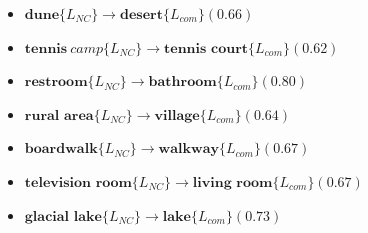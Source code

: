 \begin{itemize}
    \item $\textbf{dune} \{L_{NC}\} \rightarrow{} \textbf{desert} \{L_{com}\} (0.66)$ 
    \item $\textbf{tennis} \ camp \{L_{NC}\} \rightarrow{} \textbf{tennis \ court} \{L_{com}\}  (0.62)$
    \item $\textbf{restroom} \{L_{NC}\} \rightarrow{} \textbf{bathroom} \{L_{com}\} (0.80)$
    \item $\textbf{rural \ area} \{L_{NC}\} \rightarrow{} \textbf{village} \{L_{com}\} (0.64)$
    \item $\textbf{boardwalk} \{L_{NC}\} \rightarrow{} \textbf{walkway} \{L_{com}\} (0.67)$
    \item $\textbf{television \ room} \{L_{NC}\} \rightarrow{} \textbf{living \ room} \{L_{com}\} (0.67)$
    \item $\textbf{glacial \ lake} \{L_{NC}\} \rightarrow{} \textbf{lake} \{L_{com}\} (0.73)$
\end{itemize}

